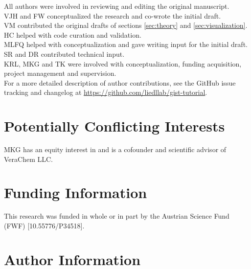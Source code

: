 \documentclass[9pt,tutorial]{livecoms}
\newcommand{\githubrepository}{\url{https://github.com/liedllab/gist-tutorial}}  %
\begin{document}
%
All authors were involved in reviewing and editing the original manuscript. \\  
VJH and FW conceptualized the research and co-wrote the initial draft.\\
VM contributed the original drafts of sections \ref{sec:theory} and \ref{sec:visualization}.\\
HC helped with code curation and validation.\\
MLFQ helped with conceptualization and gave writing input for the initial draft. \\
SR and DR contributed technical input.\\  
KRL, MKG and TK were involved with conceptualization, funding acquisition, project management and supervision.\\

For a more detailed description of author contributions,
see the GitHub issue tracking and changelog at \githubrepository.

\section*{Potentially Conflicting Interests}

MKG has an equity interest in and is a cofounder and scientific advisor of 
VeraChem LLC.

\section*{Funding Information}
This research was funded in whole or in part by the Austrian Science Fund (FWF) [10.55776/P34518].
\section*{Author Information}
\makeorcid




\end{document}
